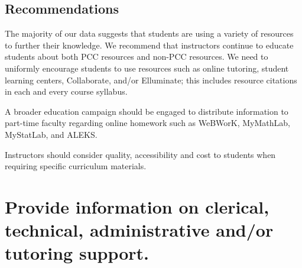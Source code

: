 \subsection{Recommendations}
The majority of our data suggests that students are using a variety of resources to further their knowledge. We recommend that instructors continue to educate students about both PCC resources and non-PCC resources. We need to uniformly encourage students to use resources such as online tutoring, student learning centers, Collaborate, and/or Elluminate; this includes resource citations in each and every course syllabus.

A broader education campaign should be engaged to distribute information to part-time faculty regarding online homework such as WeBWorK, MyMathLab, MyStatLab, and ALEKS. 

Instructors should consider quality, accessibility and cost to students when requiring specific curriculum materials. 

\section{Provide information on clerical, technical, administrative and/or tutoring support.}
